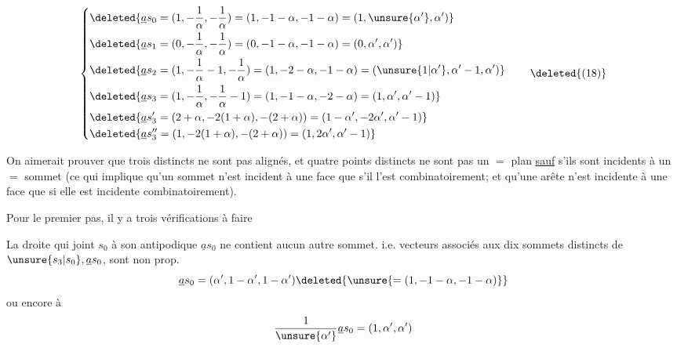 \[
\left\{\begin{aligned}
&\deleted{\underline a s_0=(1,-\frac1\alpha,-\frac1\alpha)=(1,-1-\alpha,-1-\alpha)=(1,\unsure{\alpha'},\alpha')}\\
&\deleted{\underline a s_1=(0,-\frac1\alpha,-\frac1\alpha)=(0,-1-\alpha,-1-\alpha)=(0,\alpha',\alpha')}\\
&\deleted{\underline a s_2=(1,-\frac1\alpha-1,-\frac1\alpha)=(1,-2-\alpha,-1-\alpha)=(\unsure{1|\alpha'},\alpha'-1,\alpha')}\\
&\deleted{\underline a s_3=(1,-\frac1\alpha,-\frac1\alpha-1)=(1,-1-\alpha,-2-\alpha)=(1,\alpha',\alpha'-1)}\\
&\deleted{\underline a s_3'=(2+\alpha,-2(1+\alpha),-(2+\alpha))=(1-\alpha',-2\alpha',\alpha'-1)}\\
&\deleted{\underline a s_3''=(1,-2(1+\alpha),-(2+\alpha))=(1,2\alpha',\alpha'-1)}
\end{aligned}\right.
\tag*{\deleted{(18)}}
\]

On aimerait prouver que  trois   distincts  ne sont pas alignés, et quatre points distincts ne sont pas   un $=$ plan \uline{sauf} s'ils  sont incidents  à un $=$ sommet (ce qui implique qu'un sommet n'est incident  à une face que s'il  l'est combinatoirement; et  qu'une arête n'est incidente  à une face que si elle est incidente combinatoirement).

Pour le premier pas, il y a trois vérifications à faire

 La droite qui joint $s_0$ à son antipodique $\underline a s_0$ ne contient aucun autre sommet. i.e.   vecteurs   associés aux dix sommets distincts de $\unsure{s_3|s_0},\underline a s_0$, sont non prop. 
\[
\underline a s_0=(\alpha',1-\alpha',1-\alpha')\deleted{\unsure{=(1,-1-\alpha,-1-\alpha)}}
\]
ou encore à
\[
\frac1{\unsure{\alpha'}}\underline a s_0=(1,\alpha',\alpha')
\]
